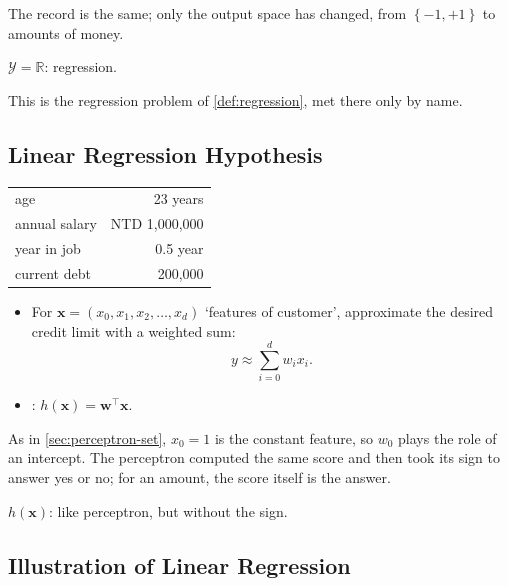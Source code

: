 The record is the same; only the output space has changed, from \(\left\{ -1,
+1 \right\}\) to amounts of money.

\begin{moral}
    \(\mathcal{Y} = \mathbb{R}\): regression.
\end{moral}

This is the regression problem of \autoref{def:regression}, met there only by
name.

\subsection{Linear Regression Hypothesis}

\begin{center}
    \small
    \begin{tabular}{@{}|l|r|@{}}
        \hline
        age & 23 years\\
        annual salary & NTD 1,000,000\\
        year in job & 0.5 year\\
        current debt & 200,000\\
        \hline
    \end{tabular}
\end{center}

\begin{itemize}
    \item For \(\bm{x} = (x_0, x_1, x_2, \dots , x_d)\) `features of
        customer', approximate the desired credit limit with a weighted sum:
        \[
            y \approx \sum_{i=0}^{d} w_i x_i .
        \]
    \item {}: \(h(\bm{x}) = \bm{w}^\top
        \bm{x}\).
\end{itemize}

As in \autoref{sec:perceptron-set}, \(x_0 = 1\) is the constant feature, so
\(w_0\) plays the role of an intercept. The perceptron computed the same score
and then took its sign to answer yes or no; for an amount, the score itself is
the answer.

\begin{moral}
    \(h(\bm{x})\): like perceptron, but without the sign.
\end{moral}

\subsection{Illustration of Linear Regression}


